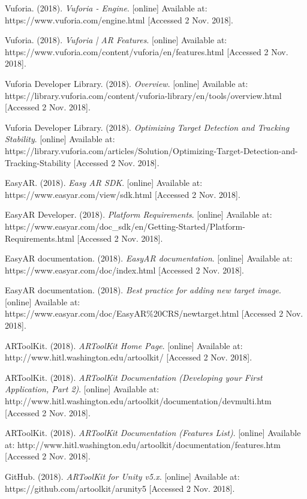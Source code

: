 \documentclass[letterpaper, 10pt, onecolumn, draftclsnofoot]{IEEEtran}
\begin{document}
\begin{thebibliography}{1}
     Vuforia. (2018). \textit{Vuforia - Engine}. [online] Available at: https://www.vuforia.com/engine.html [Accessed 2 Nov. 2018]. 
    
     Vuforia. (2018). \textit{Vuforia | AR Features}. [online] Available at: https://www.vuforia.com/content/vuforia/en/features.html [Accessed 2 Nov. 2018]. 
    
     Vuforia Developer Library. (2018). \textit{Overview}. [online] Available at: https://library.vuforia.com/content/vuforia-library/en/tools/overview.html [Accessed 2 Nov. 2018].  
    
     Vuforia Developer Library. (2018). \textit{Optimizing Target Detection and Tracking Stability}. [online] Available at: https://library.vuforia.com/articles/Solution/Optimizing-Target-Detection-and-Tracking-Stability [Accessed 2 Nov. 2018].  
    
     EasyAR. (2018). \textit{Easy AR SDK}. [online] Available at: https://www.easyar.com/view/sdk.html [Accessed 2 Nov. 2018].  
    
     EasyAR Developer. (2018). \textit{Platform Requirements}. [online] Available at: https://www.easyar.com/doc\_sdk/en/Getting-Started/Platform-Requirements.html [Accessed 2 Nov. 2018].
    
     EasyAR documentation. (2018). \textit{EasyAR documentation}. [online] Available at: https://www.easyar.com/doc/index.html [Accessed 2 Nov. 2018].
    
     EasyAR documentation. (2018). \textit{Best practice for adding new target image}. [online] Available at: https://www.easyar.com/doc/EasyAR\%20CRS/newtarget.html [Accessed 2 Nov. 2018].
    
     ARToolKit. (2018). \textit{ARToolKit Home Page}. [online] Available at: http://www.hitl.washington.edu/artoolkit/ [Accessed 2 Nov. 2018].
    
     ARToolKit. (2018). \textit{ARToolKit Documentation (Developing your First Application, Part 2)}. [online] Available at: http://www.hitl.washington.edu/artoolkit/documentation/devmulti.htm [Accessed 2 Nov. 2018].
    
     ARToolKit. (2018). \textit{ARToolKit Documentation (Features List)}. [online] Available at: http://www.hitl.washington.edu/artoolkit/documentation/features.htm [Accessed 2 Nov. 2018].
    
     GitHub. (2018). \textit{ARToolKit for Unity v5.x}. [online] Available at: https://github.com/artoolkit/arunity5 [Accessed 2 Nov. 2018].
    
\end{thebibliography}
\end{document}

